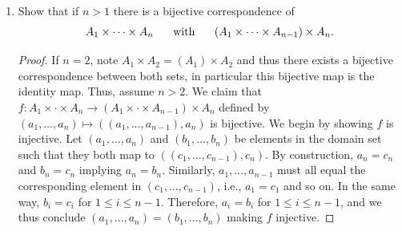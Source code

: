 \documentclass[12pt]{article}
\begin{document}
	\begin{enumerate}[label=(\alph*)]
		\item Show that if $n > 1$ there is a bijective correspondence of 
		$$
		A_1 \times \cdots \times A_n \hspace{5mm} \text{ with } \hspace{5mm} 
		(A_1 \times \cdots \times A_{n-1}) \times A_n.
		$$
		\begin{proof}
			If $n = 2$, note $A_1 \times A_2 = (A_1) \times A_2$ and thus
			there exists a bijective correspondence between both sets, in 
			particular this bijective map is the identity map. Thus, assume $n > 2$.
			We claim that $f: A_1 \times \cdot \times A_n \to (A_1 \times \cdot \times A_{n - 1}) \times A_n$
			defined by $(a_1, \ldots, a_n) \mapsto ((a_1, \ldots, a_{n-1}), a_n)$
			is bijective. We begin by showing $f$ is injective. Let 
			$(a_1, \ldots, a_n)$ and $(b_1, \ldots, b_n)$ be elements in the
			domain set such that they both map to $((c_1, \ldots, c_{n -1}), c_n)$.
			By construction, $a_n = c_n$ and $b_n = c_n$ implying $a_n = b_n$.
			Similarly, $a_1, \ldots, a_{n-1}$ must all equal the corresponding
			element in $(c_1, \ldots, c_{n -1})$, i.e., $a_1 = c_1$ and so on.
			In the same way, $b_i = c_i$ for $1 \leq i \leq n - 1$.
			Therefore, $a_i = b_i$ for $1 \leq i \leq n - 1$, and we thus conclude
			$(a_1, \ldots, a_n) = (b_1, \ldots, b_n)$ making $f$ injective.


\end{proof}
\end{enumerate}
\end{document}
